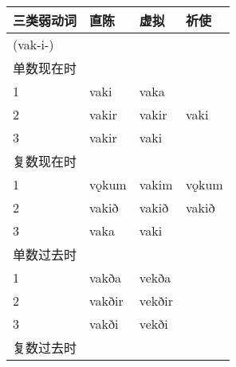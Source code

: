 \begin{longtable}{llll}
  \toprule
  三类弱动词 & 直陈                                                                                               & 虚拟   & 祈使  \\
  \midrule
  \endhead
  \bottomrule
  \endfoot
  (vak-i-)   &                                                                                                    &        &       \\
  单数现在时 &                                                                                                    &        &       \\
  1          & vaki                                                                                               & vaka   &       \\
  2          & vakir                                                                                              & vakir  & vaki  \\
  3          & vakir                                                                                              & vaki   &       \\
  复数现在时 &                                                                                                    &        &       \\
  1          & vǫkum                                                                                              & vakim  & vǫkum \\
  2          & vakið                                                                                              & vakið  & vakið \\
  3          & vaka                                                                                               & vaki   &       \\
  单数过去时 &                                                                                                    &        &       \\
  1          & vakða                                                                                              & vekða  &       \\
  2          & vakðir                                                                                             & vekðir &       \\
  3          & vakði                                                                                              & vekði  &       \\
  复数过去时 &                                                                                                    &        &       \\

\end{longtable}
